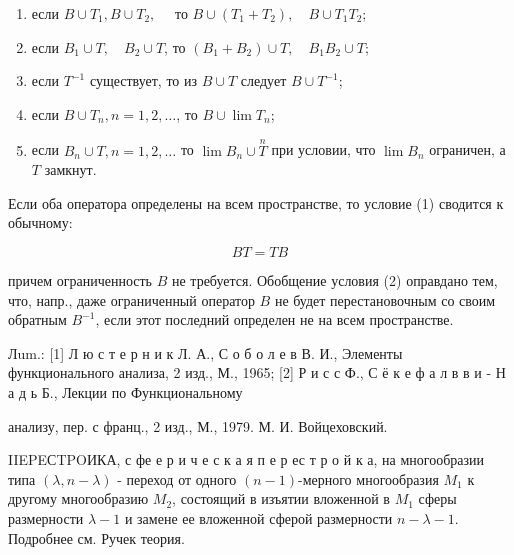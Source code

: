 \documentclass[10pt]{article}
\begin{document}
\begin{enumerate}

  \item если $B \cup T_{1}, B \cup T_{2}, \quad$ то $B \cup\left(T_{1}+T_{2}\right), \quad B \cup T_{1} T_{2}$;



  \item если $B_{1} \cup T, \quad B_{2} \cup T$, то $\left(B_{1}+B_{2}\right) \cup T, \quad B_{1} B_{2} \cup T$;



  \item если $T^{-1}$ существует, то из $B \cup T$ следует $B \cup T^{-1}$;



  \item если $B \cup T_{n}, n=1,2, \ldots$, то $B \cup \lim T_{n}$;



  \item если $B_{n} \cup T, n=1,2, \ldots$ то $\lim B_{n} \cup \stackrel{n}{T}$ при условии, что $\lim B_{n}$ ограничен, а $T$ замкнут.



\end{enumerate}



Если оба оператора определены на всем пространстве, то условие (1) сводится к обычному:



\[

B T=T B

\]



причем ограниченность $B$ не требуется. Обобщение условия (2) оправдано тем, что, напр., даже ограниченный оператор $B$ не будет перестановочным со своим обратным $B^{-1}$, если этот последний определен не на всем пространстве.



Лum.: [1] Л ю с т е р н и к Л. А., С о б о л е в В. И., Элементы функционального анализа, 2 изд., М., 1965; [2] Р и с с Ф., С ё к е ф а л в в и - Н а д ь Б., Лекции по Функциональному

анализу, пер. с франц., 2 изд., М., 1979. М. И. Войцеховский.



IIEPEСTPOИКА, с фе е р и ч е с к а я п е р ес т р о й к а, на многообразии типа $(\lambda, n-\lambda)$ - переход от одного $(n-1)$-мерного многообразия $M_{1}$ к другому многообразию $M_{2}$, состоящий в изъятии вложенной в $M_{1}$ сферы размерности $\lambda-1$ и замене ее вложенной сферой размерности $n-\lambda-1$. Подробнее см. Ручек теория.
\end{document}
